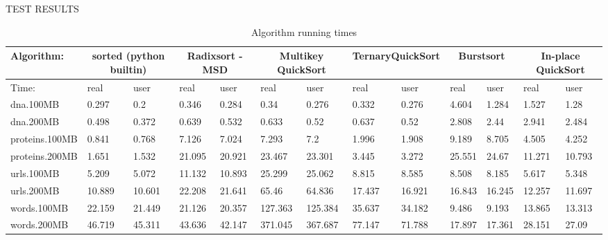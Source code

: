 \sffamily\normalsize{\color{sciorange}TEST RESULTS}\small
\footnotesize 
\begin{table}
    \begin{center}
        \begin{tabular}{| l | l | l | l | l | l | l | l | l | l | l | l | l |}
        \hline
Algorithm: & \multicolumn{2}{|c|}{sorted (python builtin)} & \multicolumn{2}{|c|}{Radixsort - MSD} & \multicolumn{2}{|c|}{Multikey QuickSort} &\multicolumn{2}{|c|}{TernaryQuickSort} & \multicolumn{2}{|c|}{Burstsort}  &  \multicolumn{2}{|c|}{In-place QuickSort}\\ \hline 
Time:   &  real&   user&   real&   user&   real&   user&   real&   user&   real&   user&   real&   user\\ \hline
dna.100MB&  0.297&  0.2&0.346&  0.284&  0.34&   0.276&  0.332&  0.276&  4.604&  1.284&  1.527&  1.28\\
dna.200MB&  0.498&  0.372&  0.639&  0.532&  0.633&  0.52&   0.637&  0.52&   2.808&  2.44&   2.941&  2.484\\
proteins.100MB& 0.841&  0.768&  7.126&  7.024&  7.293&  7.2&1.996&  1.908&  9.189&  8.705&  4.505&  4.252\\
proteins.200MB& 1.651&  1.532&  21.095& 20.921& 23.467& 23.301& 3.445&  3.272&  25.551& 24.67&  11.271& 10.793\\
urls.100MB& 5.209&  5.072&  11.132& 10.893& 25.299& 25.062& 8.815&  8.585&  8.508&  8.185&  5.617&  5.348\\
urls.200MB& 10.889& 10.601& 22.208& 21.641& 65.46&  64.836& 17.437& 16.921& 16.843& 16.245& 12.257& 11.697\\
words.100MB&22.159& 21.449& 21.126& 20.357& 127.363&125.384&35.637& 34.182& 9.486&  9.193&  13.865& 13.313\\
words.200MB&46.719& 45.311& 43.636& 42.147& 371.045&367.687&77.147& 71.788& 17.897& 17.361& 28.151& 27.09\\
        \hline
        \end{tabular}
    \end{center}
    \caption{Algorithm running times}
    \label{dataset}
\end{table}

